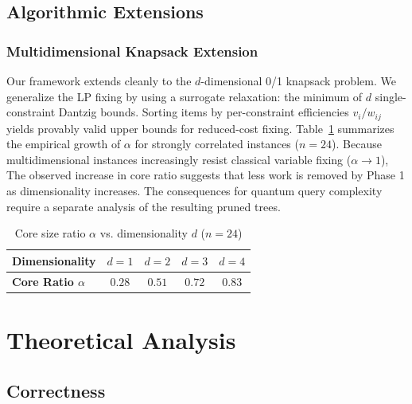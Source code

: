 \documentclass[conference]{IEEEtran} \IEEEoverridecommandlockouts
\begin{document}
\subsection{Algorithmic Extensions}



\subsubsection{Multidimensional Knapsack Extension}
Our framework extends cleanly to the $d$-dimensional 0/1 knapsack problem. We generalize the LP fixing by using a surrogate relaxation: the minimum of $d$ single-constraint Dantzig bounds. Sorting items by per-constraint efficiencies $v_i/w_{ij}$ yields provably valid upper bounds for reduced-cost fixing. Table~\ref{tab:multidim} summarizes the empirical growth of $\alpha$ for strongly correlated instances ($n=24$). Because multidimensional instances increasingly resist classical variable fixing ($\alpha \to 1$), The observed increase in core ratio suggests that less work is removed by Phase 1 as dimensionality increases. The consequences for quantum query complexity require a separate analysis of the resulting pruned trees.

\begin{table}[htbp]
\caption{Core size ratio $\alpha$ vs. dimensionality $d$ ($n=24$)}
\label{tab:multidim}
\begin{center}
\begin{tabular}{lcccc}
\toprule
\textbf{Dimensionality} & $d=1$ & $d=2$ & $d=3$ & $d=4$ \\
\midrule
\textbf{Core Ratio $\alpha$} & $0.28$ & $0.51$ & $0.72$ & $0.83$ \\
\bottomrule
\end{tabular}
\end{center}
\end{table}

\section{Theoretical Analysis}

\subsection{Correctness}
\end{document}
